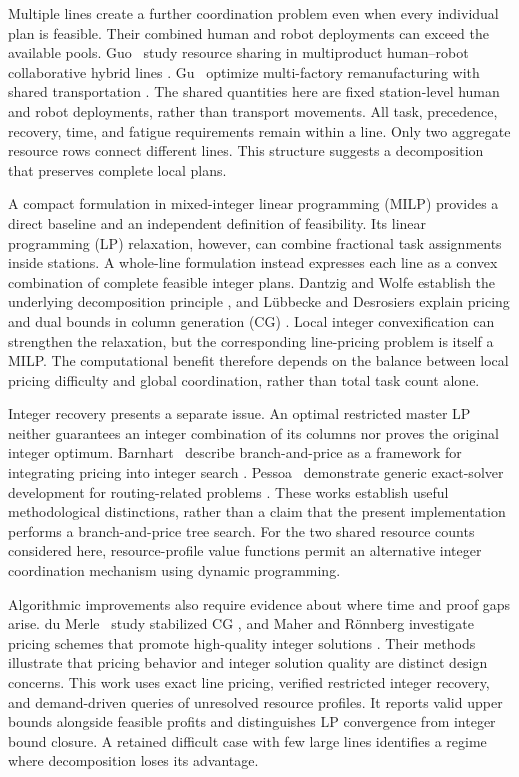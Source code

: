 Multiple lines create a further coordination problem even when every individual plan is feasible. Their combined human and robot deployments can exceed the available pools. Guo \etal\ study resource sharing in multiproduct human--robot collaborative hybrid lines \cite{Guo2025}. Gu \etal\ optimize multi-factory remanufacturing with shared transportation \cite{Gu2025}. The shared quantities here are fixed station-level human and robot deployments, rather than transport movements. All task, precedence, recovery, time, and fatigue requirements remain within a line. Only two aggregate resource rows connect different lines. This structure suggests a decomposition that preserves complete local plans.

A compact formulation in mixed-integer linear programming (MILP) provides a direct baseline and an independent definition of feasibility. Its linear programming (LP) relaxation, however, can combine fractional task assignments inside stations. A whole-line formulation instead expresses each line as a convex combination of complete feasible integer plans. Dantzig and Wolfe establish the underlying decomposition principle \cite{Dantzig1960}, and L\"ubbecke and Desrosiers explain pricing and dual bounds in column generation (CG) \cite{Lubbecke2005}. Local integer convexification can strengthen the relaxation, but the corresponding line-pricing problem is itself a MILP. The computational benefit therefore depends on the balance between local pricing difficulty and global coordination, rather than total task count alone.

Integer recovery presents a separate issue. An optimal restricted master LP neither guarantees an integer combination of its columns nor proves the original integer optimum. Barnhart \etal\ describe branch-and-price as a framework for integrating pricing into integer search \cite{Barnhart1998}. Pessoa \etal\ demonstrate generic exact-solver development for routing-related problems \cite{Pessoa2020}. These works establish useful methodological distinctions, rather than a claim that the present implementation performs a branch-and-price tree search. For the two shared resource counts considered here, resource-profile value functions permit an alternative integer coordination mechanism using dynamic programming.

Algorithmic improvements also require evidence about where time and proof gaps arise. du Merle \etal\ study stabilized CG \cite{duMerle1999}, and Maher and R\"onnberg investigate pricing schemes that promote high-quality integer solutions \cite{Maher2023}. Their methods illustrate that pricing behavior and integer solution quality are distinct design concerns. This work uses exact line pricing, verified restricted integer recovery, and demand-driven queries of unresolved resource profiles. It reports valid upper bounds alongside feasible profits and distinguishes LP convergence from integer bound closure. A retained difficult case with few large lines identifies a regime where decomposition loses its advantage.


